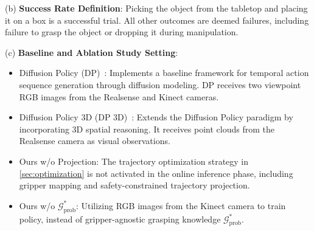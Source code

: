 (b) \textbf{Success Rate Definition}: Picking the object from the tabletop and placing it on a box is a successful trial. All other outcomes are deemed failures, including failure to grasp the object or dropping it during manipulation.

(c) \textbf{Baseline and Ablation Study Setting}: 
\begin{itemize}
  \item Diffusion Policy (DP)~\cite{chi2023diffusion}:  Implements a baseline framework for temporal action sequence generation through diffusion modeling. DP receives two viewpoint RGB images from the Realsense and Kinect cameras.
  \item Diffusion Policy 3D (DP 3D)~\cite{Ze2024DP3}: Extends the Diffusion Policy paradigm by incorporating 3D spatial reasoning. It receives point clouds from the Realsense camera as visual observations.
  \item Ours w/o Projection: The trajectory optimization strategy in \ref{sec:optimization} is not activated in the online inference phase, including gripper mapping and safety-constrained trajectory projection.
  \item Ours w/o $\mathcal{G}^*_{\text{prob}}$: Utilizing RGB images from the Kinect camera to train policy, instead of gripper-agnostic grasping knowledge $\mathcal{G}^*_{\text{prob}}$.
\end{itemize}



